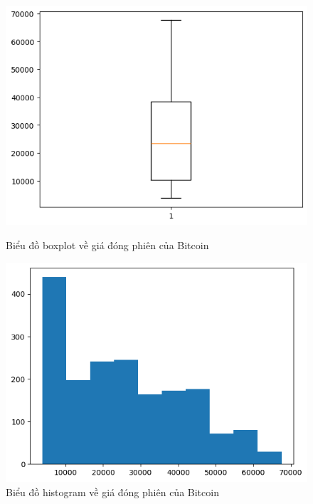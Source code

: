 \documentclass[conference]{IEEEtran}
\begin{document}
\begin{figure}[H]
    \centering
    \begin{minipage}{0.23\textwidth}
    \centering
    \includegraphics[width=1\textwidth]{bibliography/pictures/BTCboxplot.png}
    \caption{Biểu đồ boxplot về giá đóng phiên của Bitcoin}
    \label{fig:1}
    \end{minipage}
    \hfill
    \begin{minipage}{0.23\textwidth}
    \centering
    \includegraphics[width=1\textwidth]{bibliography/pictures/BTChistogram.png}
    \caption{Biểu đồ histogram về giá đóng phiên của Bitcoin}
    \label{fig:2}
    \end{minipage}
\end{figure}
\end{document}
